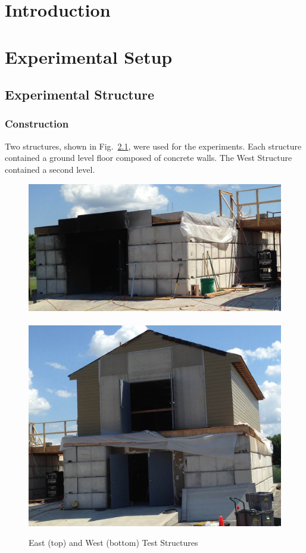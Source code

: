 \documentclass[12pt,oneside]{book}
\begin{document}
\mainmatter

\chapter{Introduction}
\label{chap:Introduction}

\chapter{Experimental Setup}
\label{chap:Experimental_Setup}

\section{Experimental Structure}
\label{sec:Experimental_Structure}

\subsection{Construction}
\label{sec:Construction}
Two structures, shown in Fig.~\ref{fig:struct_pics}, were used for the experiments. Each structure contained a ground level floor composed of concrete walls. The West Structure contained a second level.

\begin{figure}[!ht]
\includegraphics[width=6in]{../Pictures/east_structure}
\\~\\
\includegraphics[width=6in]{../Pictures/west_structure}
\caption{East (top) and West (bottom) Test Structures}
\label{fig:struct_pics}
\end{figure}
\end{document}
